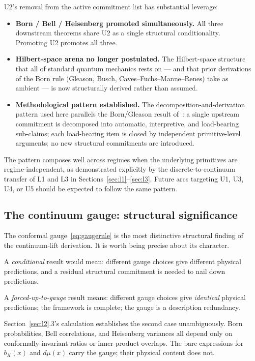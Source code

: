 \documentclass[11pt,a4paper]{article}
\begin{document}
U2's removal from the active commitment list has substantial leverage:

\begin{itemize}
  \item \textbf{Born / Bell / Heisenberg promoted simultaneously.} All three downstream theorems share U2 as a single structural conditionality. Promoting U2 promotes all three.
  \item \textbf{Hilbert-space arena no longer postulated.} The Hilbert-space structure that all of standard quantum mechanics rests on --- and that prior derivations of the Born rule (Gleason, Busch, Caves--Fuchs--Manne--Renes) take as ambient --- is now structurally derived rather than assumed.
  \item \textbf{Methodological pattern established.} The decomposition-and-derivation pattern used here parallels the Born/Gleason result of~\cite{borngleason}: a single upstream commitment is decomposed into automatic, interpretive, and load-bearing sub-claims; each load-bearing item is closed by independent primitive-level arguments; no new structural commitments are introduced.
\end{itemize}

The pattern composes well across regimes when the underlying primitives are regime-independent, as demonstrated explicitly by the discrete-to-continuum transfer of L1 and L3 in Sections~\ref{sec:l1}--\ref{sec:l3}. Future arcs targeting U1, U3, U4, or U5 should be expected to follow the same pattern.

\subsection{The continuum gauge: structural significance}

The conformal gauge~\eqref{eq:gaugerule} is the most distinctive structural finding of the continuum-lift derivation. It is worth being precise about its character.

A \emph{conditional} result would mean: different gauge choices give different physical predictions, and a residual structural commitment is needed to nail down predictions.

A \emph{forced-up-to-gauge} result means: different gauge choices give \emph{identical} physical predictions; the framework is complete; the gauge is a description redundancy.

Section~\ref{sec:l2}.3's calculation establishes the second case unambiguously. Born probabilities, Bell correlations, and Heisenberg variances all depend only on conformally-invariant ratios or inner-product overlaps. The bare expressions for $b_K(x)$ and $d\mu(x)$ carry the gauge; their physical content does not.
\end{document}
